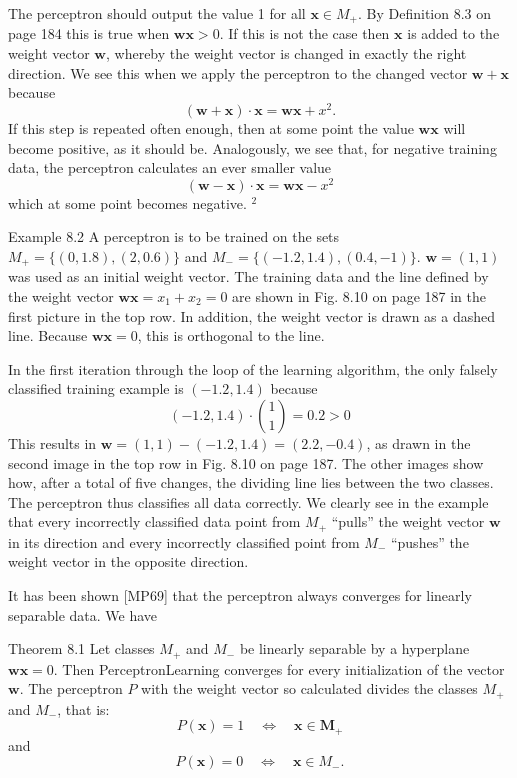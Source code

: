 \documentclass[10pt]{book}
\begin{document}
The perceptron should output the value 1 for all $\boldsymbol{x} \in M_{+}$. By Definition 8.3 on page 184 this is true when $\boldsymbol{w} \boldsymbol{x}>0$. If this is not the case then $\boldsymbol{x}$ is added to the weight vector $\boldsymbol{w}$, whereby the weight vector is changed in exactly the right direction. We see this when we apply the perceptron to the changed vector $\boldsymbol{w}+\boldsymbol{x}$ because
$$
(\boldsymbol{w}+\boldsymbol{x}) \cdot \boldsymbol{x}=\boldsymbol{w} \boldsymbol{x}+x^{2}.
$$
If this step is repeated often enough, then at some point the value $\boldsymbol{w} \boldsymbol{x}$ will become positive, as it should be. Analogously, we see that, for negative training data, the perceptron calculates an ever smaller value
$$
(\boldsymbol{w}-\boldsymbol{x}) \cdot \boldsymbol{x}=\boldsymbol{w} \boldsymbol{x}-x^{2}
$$
which at some point becomes negative. ${ }^{2}$

Example 8.2 A perceptron is to be trained on the sets $M_{+}=\{(0,1.8),(2,0.6)\}$ and $M_{-}=\{(-1.2,1.4),(0.4,-1)\}$. $\boldsymbol{w}=(1,1)$ was used as an initial weight vector. The training data and the line defined by the weight vector $\boldsymbol{w} \boldsymbol{x}=x_{1}+x_{2}=0$ are shown in Fig. 8.10 on page 187 in the first picture in the top row. In addition, the weight vector is drawn as a dashed line. Because $\boldsymbol{w} \boldsymbol{x}=0$, this is orthogonal to the line.

In the first iteration through the loop of the learning algorithm, the only falsely classified training example is $(-1.2,1.4)$ because
$$
(-1.2,1.4) \cdot\binom{1}{1}=0.2>0
$$
This results in $\boldsymbol{w}=(1,1)-(-1.2,1.4)=(2.2,-0.4)$, as drawn in the second image in the top row in Fig. 8.10 on page 187. The other images show how, after a total of five changes, the dividing line lies between the two classes. The perceptron thus classifies all data correctly. We clearly see in the example that every incorrectly classified data point from $M_{+}$ ``pulls'' the weight vector $\boldsymbol{w}$ in its direction and every incorrectly classified point from $M_{-}$ ``pushes'' the weight vector in the opposite direction.

It has been shown [MP69] that the perceptron always converges for linearly separable data. We have

Theorem 8.1 Let classes $M_{+}$ and $M_{-}$ be linearly separable by a hyperplane $\boldsymbol{w} \boldsymbol{x}=0$. Then PerceptronLearning converges for every initialization of the vector $\boldsymbol{w}$. The perceptron $P$ with the weight vector so calculated divides the classes $M_{+}$ and $M_{-}$, that is:
$$
P(\boldsymbol{x})=1 \quad \Leftrightarrow \quad \boldsymbol{x} \in \boldsymbol{M}_{+}
$$
and
$$
P(\boldsymbol{x})=0 \quad \Leftrightarrow \quad \boldsymbol{x} \in M_{-}.
$$
\end{document}
